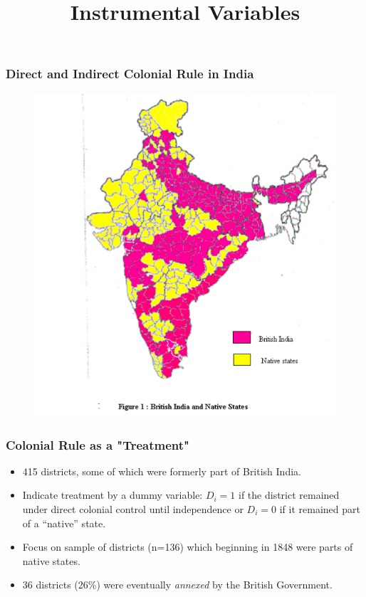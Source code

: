\documentclass{beamer}
\title{Instrumental Variables}
\begin{document}
\frame{\titlepage}


\begin{frame}
  \frametitle{Direct and Indirect Colonial Rule in India}
  \begin{figure}[t]
    \centering
      \includegraphics[scale=.35]{indiamap}
 \end{figure}
\end{frame}

\begin{frame}
  \frametitle{Colonial Rule as a "Treatment"}
  \begin{itemize}
  \item 415 districts, some of which were formerly part of British
    India.
  \item Indicate treatment by a dummy variable: 
    $D_i=1$ if the district remained under direct colonial control
    until independence or $D_i=0$ if it remained part of a ``native''
    state.
  \item Focus on sample of districts (n=136) which beginning in 1848 were
    parts of native states.
  \item 36 districts (26\%) were eventually \textit{annexed} by the British
    Government. 
  \end{itemize}
\end{frame}
\end{document}
